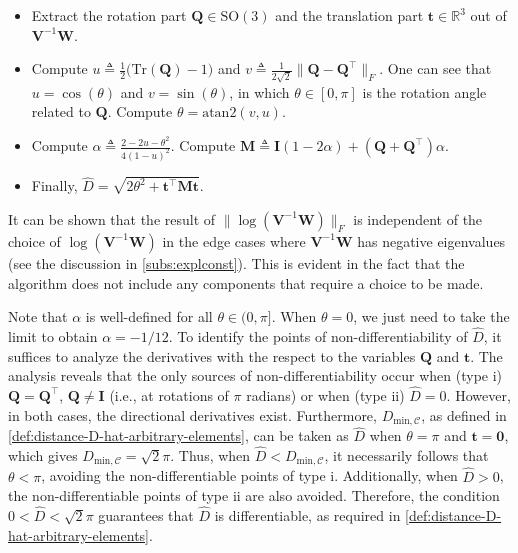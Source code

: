 \begin{itemize}
    \item Extract the rotation part $\mathbf{Q} \in \text{SO}(3)$ and the translation part $\mathbf{t} \in \mathbb{R}^3$ out of $\mathbf{V}^{-1}\mathbf{W}$.

    \item Compute $u \triangleq \frac{1}{2}\bigl(\text{Tr}(\mathbf{Q})-1\bigr)$ and $v \triangleq \frac{1}{2\sqrt{2}}\|\mathbf{Q}{-}\mathbf{Q}^{\top}\|_F$. One can see that $u = \cos(\theta)$ and $v=\sin(\theta)$, in which $\theta \in [0, \pi]$ is the rotation angle related to $\mathbf{Q}$. Compute $\theta = \text{atan2}(v,u)$.

    \item Compute $\alpha \triangleq \frac{2-2u-\theta^2}{4(1-u)^2}$. Compute
    $\mathbf{M} \triangleq  \mathbf{I}(1-2\alpha) +  (\mathbf{Q}+\mathbf{Q}^{\top})\alpha$.

    \item Finally, $\widehat{D}= \sqrt{2\theta^2 + \mathbf{t}^\top \mathbf{M}\mathbf{t}}$.

\end{itemize}

It can be shown that the result of $\|\log(\mathbf{V}^{-1}\mathbf{W})\|_F$ is independent of the choice of $\log(\mathbf{V}^{-1}\mathbf{W})$ in the edge cases where $\mathbf{V}^{-1}\mathbf{W}$ has negative eigenvalues (see the discussion in \cref{subs:explconst}). This is evident in the fact that the algorithm does not include any components that require a choice to be made.

Note that $\alpha$ is well-defined for all $\theta \in (0,\pi]$. When $\theta=0$, we just need to take the limit to obtain $\alpha=-1/12$. To identify the points of non-differentiability of $\widehat{D}$, it suffices to analyze the derivatives with the respect to the variables $\mathbf{Q}$ and $\mathbf{t}$. The analysis reveals that the only sources of non-differentiability occur when (type i) $\mathbf{Q}=\mathbf{Q}^\top$, $\mathbf{Q} \not= \mathbf{I}$ (i.e., at rotations of $\pi$ radians) or when (type ii) $\widehat{D}=0$. However, in both cases, the directional derivatives exist. Furthermore, $D_{\text{min},\mathcal{C}}$, as defined in \cref{def:distance-D-hat-arbitrary-elements}, can be taken as $\widehat{D}$ when $\theta = \pi$  and $\mathbf{t} = \mathbf{0}$, which gives $D_{\text{min},\mathcal{C}} = \sqrt{2}\pi$. Thus, when $\widehat{D} < D_{\text{min},\mathcal{C}}$, it necessarily follows that $\theta < \pi$, avoiding the non-differentiable points of type i. Additionally, when $\widehat{D} > 0$, the non-differentiable points of type ii are also avoided. Therefore, the condition $0 < \widehat{D} < \sqrt{2}\pi$ guarantees that $\widehat{D}$ is differentiable, as required in \cref{def:distance-D-hat-arbitrary-elements}.

